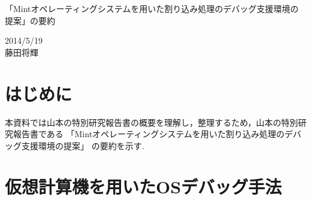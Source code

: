 \documentclass[12pt]{jsarticle}
\begin{document}

\begin{center}
{\LARGE 「Mintオペレーティングシステムを用いた割り込み処理のデバッグ支援環境の提案」の要約}
\end{center}

\begin{flushright}
  2014/5/19\\
  藤田将輝
\end{flushright}
\section{はじめに}
本資料では山本の特別研究報告書の概要を理解し，整理するため，山本の特別研究報告書である
「Mintオペレーティングシステムを用いた割り込み処理のデバッグ支援環境の提案」\cite{yama}
の要約を示す.

\section{仮想計算機を用いたOSデバッグ手法}

\end{document}

